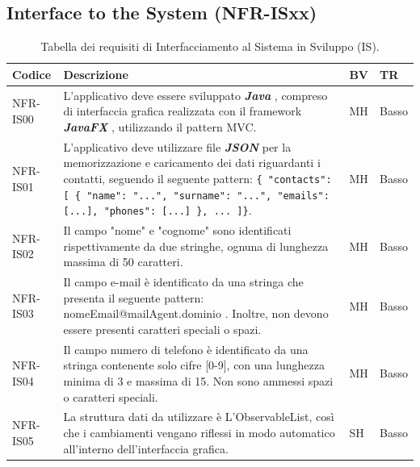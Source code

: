\documentclass[a4paper,12pt]{article}
\begin{document}
    \subsection{Interface to the System (NFR-ISxx)}
    \begin{table}[H]
        \centering
        \begin{tabular}{|l|p{8cm}|l|l|}
            \hline
            \textbf{Codice} & \textbf{Descrizione} & \textbf{BV} & \textbf{TR} \\
            \hline
            NFR-IS00 & L'applicativo deve essere sviluppato \textbf{\textit{Java}} , compreso di interfaccia grafica realizzata con il framework \textbf{\textit{JavaFX}} , utilizzando il pattern MVC. & MH & Basso \\
            \hline
            NFR-IS01 & L'applicativo deve utilizzare file \textbf{\textit{JSON}} per la memorizzazione e caricamento dei dati riguardanti i contatti, seguendo il seguente pattern: \texttt{\{ "contacts": [ \{ "name": "...", "surname": "...", "emails": [...], "phones": [...] \}, ... ]\}}. & MH & Basso \\
            \hline
            NFR-IS02 & Il campo "nome" e "cognome" sono identificati rispettivamente da due stringhe, ognuna di lunghezza massima di 50 caratteri. & MH & Basso \\
            \hline
            NFR-IS03 & Il campo e-mail è identificato da una stringa che presenta il seguente pattern: nomeEmail@mailAgent.dominio . Inoltre, non devono essere presenti caratteri speciali o spazi. & MH & Basso \\
            \hline
            NFR-IS04 & Il campo numero di telefono è identificato da una stringa contenente solo cifre [0-9], con una lunghezza minima di 3 e massima di 15. Non sono ammessi spazi o caratteri speciali. & MH & Basso \\
            \hline
            NFR-IS05 & La struttura dati da utilizzare è L'ObservableList, così che i cambiamenti vengano riflessi in modo automatico all'interno dell'interfaccia grafica. & SH & Basso \\
            \hline
            \hline
        \end{tabular}
        \caption{Tabella dei requisiti di Interfacciamento al Sistema in Sviluppo (IS).}
    \end{table}
\end{document}
